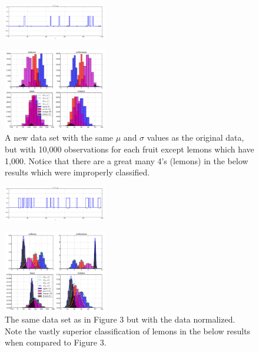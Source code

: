 \begin{multicols}{2}
\begin{figure}[H]
  \centering
		\includegraphics[width=0.4\textwidth]{images/results_original_normed.png}
\end{figure}

\end{multicols}
\begin{multicols}{2}

\begin{figure}[H]
  \centering
		\includegraphics[width=0.4\textwidth]{images/not_normed_new.png}
  \caption{\scriptsize A new data set with the same $\mu$ and $\sigma$ values as the original data, but with 10,000 observations for each fruit except lemons which have 1,000.  Notice that there are a great many 4's (lemons) in the below results which were improperly classified.}
\end{figure}

\begin{figure}[H]
  \centering
		\includegraphics[width=0.4\textwidth]{images/results_new_not_normed.png}
\end{figure}

\begin{figure}[H]
  \centering
		\includegraphics[width=0.4\textwidth]{images/normed_new.png}
  \caption{\scriptsize The same data set as in Figure 3 but with the data normalized.  Note the vastly superior classification of lemons in the below results when compared to Figure 3.}
\end{figure}


\end{multicols}
